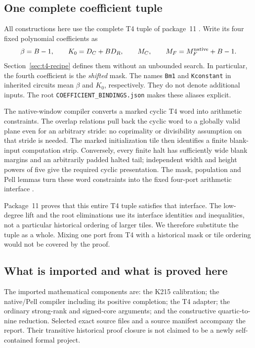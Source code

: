 \documentclass[11pt,a4paper]{article}
\theoremstyle{remark}
\begin{document}
\subsection{One complete coefficient tuple}

All constructions here use the complete T4 tuple of package~11
\cite{t4}.  Write its four fixed polynomial coefficients as
\[
 \beta=B-1,\qquad K_0=D_C+BD_R,\qquad M_C,\qquad
 M_F=M_F^{\rm native}+B-1.
\]
Section~\ref{sec:t4-recipe} defines them without an unbounded search.
In particular, the fourth coefficient is the \emph{shifted} mask.
The names \texttt{Bm1} and \texttt{Kconstant} in inherited circuits mean
$\beta$ and $K_0$, respectively.  They do not denote additional inputs.
The root \texttt{COEFFICIENT\_BINDINGS.json} makes these aliases explicit.

The native-window compiler converts a marked cyclic T4 word into
arithmetic constraints.  The overlap relations pull back the cyclic
word to a globally valid plane even for an arbitrary stride: no
coprimality or divisibility assumption on that stride is needed.
The marked initialization tile then identifies a finite blank-input
computation strip.  Conversely, every finite halt has sufficiently
wide blank margins and an arbitrarily padded halted tail; independent
width and height powers of five give the required cyclic presentation.
The mask, population and Pell lemmas turn these word constraints into
the fixed four-port arithmetic interface \cite{t4,pellinterface}.

Package~11 proves that this entire T4 tuple satisfies that interface.
The low-degree lift and the root eliminations use its interface
identities and inequalities, not a particular historical ordering of
larger tiles.  We therefore substitute the tuple as a whole.  Mixing
one port from T4 with a historical mask or tile ordering would not be
covered by the proof.

\subsection{What is imported and what is proved here}

The imported mathematical components are: the K215 calibration; the
native/Pell compiler including its positive completion; the T4 adapter;
the ordinary strong-rank and signed-core arguments; and the constructive
quartic-to-nine reduction.  Selected exact source files and a source
manifest accompany the report.  Their transitive historical proof
closure is not claimed to be a newly self-contained formal project.
\end{document}
